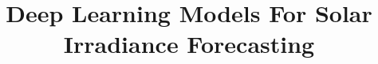\documentclass[a4paper,fleqn]{cas-sc}
\begin{document}
\let\WriteBookmarks\relax
\def\floatpagepagefraction{1}
\def\textpagefraction{.001}



\title[mode = title]{Deep Learning Models For Solar Irradiance Forecasting}  

\end{document}
